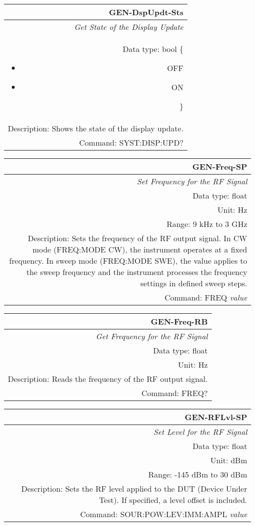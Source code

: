 \documentclass[openany]{article}
\begin{document}
		\begin{tabular}{N}
			\hline
			\bfseries GEN-DspUpdt-Sts \\ \hline
			\emph{Get State of the Display Update} \\
			Data type: bool \{\begin{itemize}[noitemsep]
				\small
				\item[] OFF
				\item[] ON
			\end{itemize}\} \\
			Description: Shows the state of the display update. \\
			Command: SYST:DISP:UPD? \\

		\end{tabular}
%
		\begin{tabular}{N}
			\hline
			\bfseries GEN-Freq-SP \\ \hline
			\emph{Set Frequency for the RF Signal} \\
			Data type: float \\
			Unit: Hz \\
			Range: 9 kHz to 3 GHz \\
			Description: Sets the frequency of the RF output signal. In CW mode (FREQ:MODE CW), the instrument operates at a fixed frequency. In sweep mode (FREQ:MODE SWE), the value applies to the sweep frequency and the instrument processes the frequency settings in defined sweep steps.\\
			Command: FREQ \emph{value} \\
			
		\end{tabular}


		\begin{tabular}{N}
			\hline
			\bfseries GEN-Freq-RB \\ \hline
			\emph{Get Frequency for the RF Signal} \\
			Data type: float \\
			Unit: Hz \\
			Description: Reads the frequency of the RF output signal. \\
			Command: FREQ? \\

		\end{tabular}
%
		\begin{tabular}{N}
			\hline
			\bfseries GEN-RFLvl-SP \\ \hline
			\emph{Set Level for the RF Signal} \\
			Data type: float \\
			Unit: dBm \\
			Range: -145 dBm to 30 dBm \\
			Description: Sets the RF level applied to the DUT (Device Under Test). If specified, a level offset is included. \\
			Command: SOUR:POW:LEV:IMM:AMPL \emph{value} \\
			
		\end{tabular}
\end{document}
